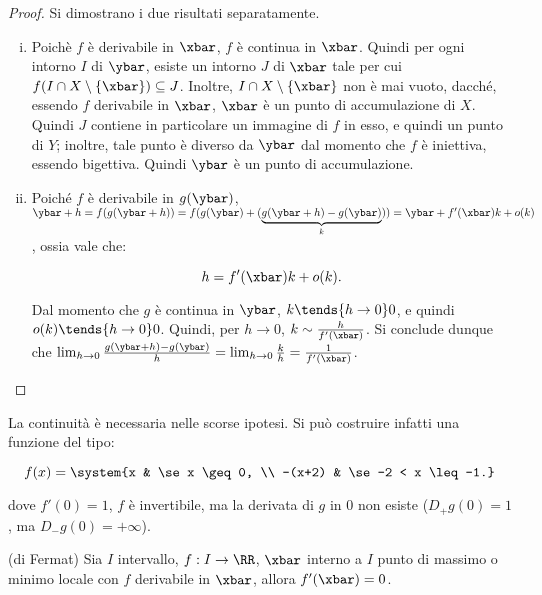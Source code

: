 \documentclass[11pt]{article}
\begin{document}
	\begin{proof} Si dimostrano i due risultati separatamente.
		\begin{enumerate}[(i)]
			\item Poichè $f$ è derivabile in $\xbar$, $f$ è continua
			in $\xbar$. Quindi per ogni intorno $I$ di $\ybar$, esiste
			un intorno $J$ di $\xbar$ tale per cui $f(I \cap X \setminus \{ \xbar \}) \subseteq J$. Inoltre, $I \cap X \setminus \{\xbar\}$ non
			è mai vuoto, dacché, essendo $f$ derivabile in $\xbar$, $\xbar$ è un punto di accumulazione di $X$. Quindi $J$ contiene in particolare un immagine di $f$ in esso, e quindi un punto di $Y$;
			inoltre, tale punto è diverso da $\ybar$ dal momento che $f$ è
			iniettiva, essendo bigettiva. Quindi $\ybar$ è un punto di accumulazione.
			\item Poiché $f$ è derivabile in $g(\ybar)$,
			$\ybar + h = f(g(\ybar + h)) = f(g(\ybar) + (\underbrace{g(\ybar + h) - g(\ybar)}_k)) = \ybar + f'(\xbar) k +
			o(k)$, ossia vale che:
			
			\[ h = f'(\xbar) k + o(k). \]
			
			Dal momento che $g$ è continua in $\ybar$, $k \tends{h \to 0} 0$, e
			quindi $o(k) \tends{h \to 0} 0$. Quindi, per $h \to 0$, $k \sim \frac{h}{f'(\xbar)}$. Si conclude
			dunque che $\lim_{h \to 0} \frac{g(\ybar + h) - g(\ybar)}{h} =
			\lim_{h \to 0} \frac{k}{h} = \frac{1}{f'(\xbar)}$.
 		\end{enumerate}
	\end{proof}

	\begin{example}
		La continuità è necessaria nelle scorse ipotesi. Si può costruire
		infatti una funzione del tipo:
		
		\[ f(x) = \system{x & \se x \geq 0, \\ -(x+2) & \se -2 < x \leq -1.} \]
		
		\vskip 0.05in
		
		dove $f'(0) = 1$, $f$ è invertibile, ma la derivata di $g$ in $0$ non
		esiste ($D_+ g(0) = 1$, ma $D_- g(0) = +\infty$).
	\end{example}

	\begin{theorem} (di Fermat)
		Sia $I$ intervallo, $f : I \to \RR$, $\xbar$ interno a $I$ punto
		di massimo o minimo locale con $f$ derivabile in $\xbar$, allora
		$f'(\xbar) = 0$.
	\end{theorem}
\end{document}
